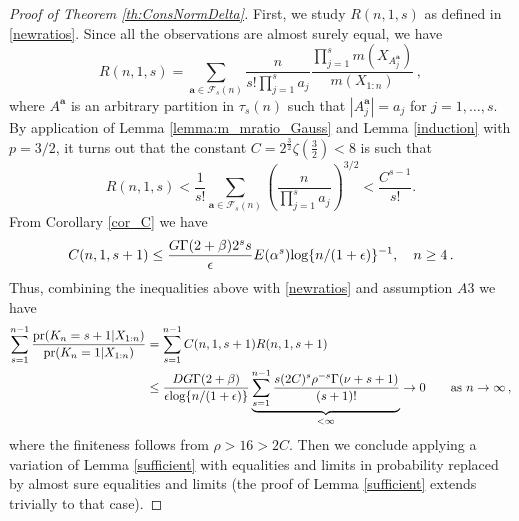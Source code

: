 \documentclass[12pt]{article}
\def\log{\hbox{log}}
\begin{document}
\begin{proof}[Proof of Theorem \ref{th:ConsNormDelta}]
First, we study $R(n,1,s)$ as defined in \eqref{newratios}. Since all the observations are almost surely equal, we have
\begin{equation*}
R(n,1,s) = \sum_{\bm{a} \in \mathcal{F}_s(n)} \frac{n}{s! \prod_{j=1}^{s} a_j} \frac{\prod_{j=1}^s m(X_{A^{\bm{a}}_j})}{m(X_{1:n})}\,,
\end{equation*}
where $A^{\bm{a}}$ is an arbitrary partition in $\tau_s(n)$ such that $|A_j^{\bm{a}}| = a_j$ for $j=1,\dots,s$. By application of Lemma \ref{lemma:m_mratio_Gauss} and Lemma \ref{induction} with $p=3/2$, it turns out that the constant $C = 2^{\frac{3}{2}}\zeta\left(\frac{3}{2} \right) < 8$ is such that
\begin{equation*}
R(n,1,s) < \frac{1}{s!} \sum_{\bm{a} \in \mathcal{F}_s(n)} \left(\frac{n}{\prod_{j=1}^{s} a_j} \right)^{3/2} < \frac{C^{s-1}}{s!}.
\end{equation*}
From Corollary \ref{cor_C} we have
\begin{equation}\label{eq:thm1_1}
C(n,1,s+1) \leq \frac{G\Gamma(2+\beta)2^ss}{\epsilon}E(\alpha^s)\log\{n/(1+\epsilon)\}^{-1}, \quad n \geq 4\,.
\end{equation}
Thus, combining the inequalities above with \eqref{newratios} and assumption $A3$ we have
\begin{equation}\label{eq:thm1_2}
\begin{aligned}
\sum_{s = 1}^{n-1}\frac{\text{pr}(K_n = s+1 | X_{1:n})}{\text{pr}(K_n = 1 | X_{1:n})} &= \sum_{s = 1}^{n-1}C(n,1,s+1)R(n,1,s+1)\\
&  \leq \frac{DG\Gamma(2+\beta)}{\epsilon \log\{n/(1+\epsilon)\}}\underbrace{\sum_{ s = 1}^{n-1}\frac{s (2C)^{s}\rho^{-s}\Gamma(\nu +s+1)}{(s+1)!}}_{< \infty} \to 0\qquad\hbox{as }n\to\infty\,,
\end{aligned}
\end{equation}
where the finiteness follows from $\rho > 16 > 2C$. Then we conclude applying a variation of Lemma \ref{sufficient} with equalities and limits in probability replaced by almost sure equalities and limits (the proof of Lemma \ref{sufficient} extends trivially to that case).
\end{proof}
\end{document}
